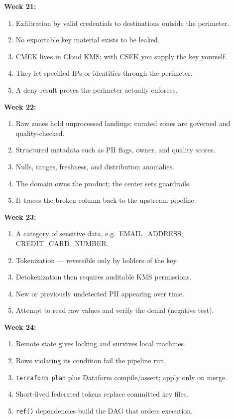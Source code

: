 \documentclass[11pt, a4paper]{article}
\begin{document}
\textbf{Week 21:}
\begin{enumerate}[nosep, leftmargin=1.5em]
    \item Exfiltration by valid credentials to destinations outside the perimeter.
    \item No exportable key material exists to be leaked.
    \item CMEK lives in Cloud KMS; with CSEK you supply the key yourself.
    \item They let specified IPs or identities through the perimeter.
    \item A deny result proves the perimeter actually enforces.
\end{enumerate}

\textbf{Week 22:}
\begin{enumerate}[nosep, leftmargin=1.5em]
    \item Raw zones hold unprocessed landings; curated zones are governed and quality-checked.
    \item Structured metadata such as PII flags, owner, and quality scores.
    \item Nulls, ranges, freshness, and distribution anomalies.
    \item The domain owns the product; the center sets guardrails.
    \item It traces the broken column back to the upstream pipeline.
\end{enumerate}

\textbf{Week 23:}
\begin{enumerate}[nosep, leftmargin=1.5em]
    \item A category of sensitive data, e.g.\ EMAIL\_ADDRESS, CREDIT\_CARD\_NUMBER.
    \item Tokenization --- reversible only by holders of the key.
    \item Detokenization then requires auditable KMS permissions.
    \item New or previously undetected PII appearing over time.
    \item Attempt to read raw values and verify the denial (negative test).
\end{enumerate}

\textbf{Week 24:}
\begin{enumerate}[nosep, leftmargin=1.5em]
    \item Remote state gives locking and survives local machines.
    \item Rows violating its condition fail the pipeline run.
    \item \texttt{terraform plan} plus Dataform compile/assert; apply only on merge.
    \item Short-lived federated tokens replace committed key files.
    \item \texttt{ref()} dependencies build the DAG that orders execution.
\end{enumerate}
\end{document}

